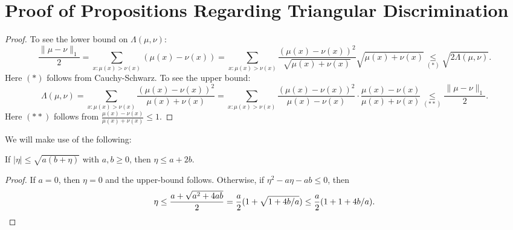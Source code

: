 \section{Proof of Propositions Regarding Triangular Discrimination} \label{sec:td-props}

\lambdatvd*

\begin{proof}
To see the lower bound on $\Lambda(\mu, \nu)$:
\[
\frac{\|\mu - \nu\|_1} 2 = \sum_{x: \mu(x) > \nu(x)} (\mu(x) - \nu(x)) =  \sum_{x: \mu(x) > \nu(x)} \frac{(\mu(x) - \nu(x))^2}{\sqrt{\mu(x) + \nu(x)}} \sqrt{\mu(x) + \nu(x)} \underset{(*)}{\leq} \sqrt{2\Lambda(\mu, \nu)}.
\]
Here $(*)$ follows from Cauchy-Schwarz. To see the upper bound:
\[
\Lambda(\mu, \nu) = \sum_{x: \mu(x) > \nu(x)}\frac{(\mu(x) - \nu(x))^2}{\mu(x) + \nu(x)} = \sum_{x: \mu(x) > \nu(x)}\frac{(\mu(x) - \nu(x))^2}{\mu(x) - \nu(x)} \cdot \frac{\mu(x) - \nu(x)}{\mu(x) + \nu(x)} \underset{(**)}{\leq} \frac{\|\mu - \nu\|_1} 2.
\]
Here $(**)$ follows from $\frac{\mu(x) - \nu(x)}{\mu(x) + \nu(x)}\leq 1$.

\end{proof}

We will make use of the following:

\begin{proposition}
\label{fact:trick1}
If $|\eta| \leq \sqrt{a(b+ \eta)}$ with $a,b\geq 0$, then $\eta \leq a + 2b$.
\end{proposition}

\begin{proof}
    If $a = 0$, then $\eta = 0$ and the upper-bound follows. Otherwise, if $\eta^2 - a \eta - a b \le 0$, then
    \[
    \eta \le \frac{a + \sqrt{a^2 + 4 a b}}{2} = \frac{a}{2} (1 + \sqrt{1 + 4 b/a}) \le \frac{a}{2}(1 + 1 + 4 b/a). \qedhere
    \]
\end{proof}

\lambdaloss*

